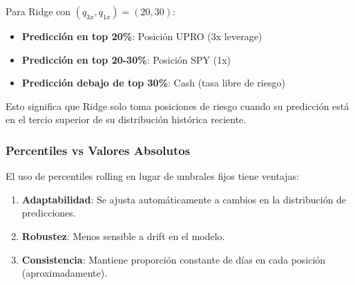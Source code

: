 Para Ridge con $(q_{3x}, q_{1x}) = (20, 30)$:

\begin{itemize}
    \item \textbf{Predicci\'on en top 20\%}: Posici\'on UPRO (3x leverage)
    \item \textbf{Predicci\'on en top 20-30\%}: Posici\'on SPY (1x)
    \item \textbf{Predicci\'on debajo de top 30\%}: Cash (tasa libre de riesgo)
\end{itemize}

Esto significa que Ridge solo toma posiciones de riesgo cuando su predicci\'on est\'a en el tercio superior de su distribuci\'on hist\'orica reciente.

\subsubsection{Percentiles vs Valores Absolutos}

El uso de percentiles rolling en lugar de umbrales fijos tiene ventajas:

\begin{enumerate}
    \item \textbf{Adaptabilidad}: Se ajusta autom\'aticamente a cambios en la distribuci\'on de predicciones.
    \item \textbf{Robustez}: Menos sensible a drift en el modelo.
    \item \textbf{Consistencia}: Mantiene proporci\'on constante de d\'ias en cada posici\'on (aproximadamente).
\end{enumerate}
